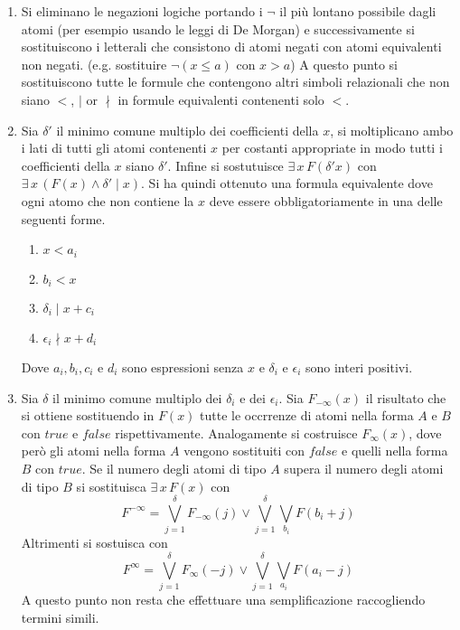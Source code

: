 \documentclass[11pt,letterpaper,twoside]{article}
\begin{document}
\begin{enumerate}[label=Step \arabic*.]
\item Si eliminano le negazioni logiche portando i $\lnot$ il più lontano
  possibile dagli atomi (per esempio usando le leggi di De Morgan) e
  successivamente si sostituiscono i letterali che consistono di atomi negati con
  atomi equivalenti non negati. (e.g. sostituire $\lnot (x \leq a)$ con $x > a$)
  A questo punto si sostituiscono tutte le formule che contengono altri simboli
  relazionali che non siano $<$, $\mid$ or $\nmid$ in formule equivalenti
  contenenti solo $<$.
\item Sia $\delta'$ il minimo comune multiplo dei coefficienti della $x$, si
  moltiplicano ambo i lati di tutti gli atomi contenenti $x$ per costanti
  appropriate in modo tutti i coefficienti della $x$ siano $\delta'$.
  Infine si sostutuisce $\exists \, x \, F(\delta' x)$ con $\exists \, x \,
  (F(x) \land \delta' \mid x)$.
  Si ha quindi ottenuto una formula equivalente dove ogni atomo che non contiene
  la $x$ deve essere obbligatoriamente in una delle seguenti forme.
  \begin{enumerate}[label=\Alph*.]
    \item $x < a_i$
    \item $b_i < x$
    \item $\delta_i \mid x + c_i$
    \item $\epsilon_i \nmid x + d_i$
  \end{enumerate}
  Dove $a_i, b_i, c_i$ e $d_i$ sono espressioni senza $x$ e $\delta_i$ e
  $\epsilon_i$ sono interi positivi.
\item Sia $\delta$ il minimo comune multiplo dei $\delta_i$ e dei
  $\epsilon_i$. Sia $F_{- \infty}(x)$ il risultato che si ottiene sostituendo in
  $F(x)$ tutte le occrrenze di atomi nella forma $A$ e $B$ con $true$ e
  $false$ rispettivamente. Analogamente si costruisce $F_{\infty}(x)$, dove però
  gli atomi nella forma $A$ vengono sostituiti con $false$ e quelli nella forma
  $B$ con $true$.
  Se il numero degli atomi di tipo $A$ supera il numero degli atomi di tipo $B$
  si sostituisca $\exists \, x \, F(x)$ con
  $$ F^{-\infty} =  \bigvee_{j=1}^{\delta} F_{- \infty}(j) \lor
  \bigvee_{j=1}^{\delta} \bigvee_{b_i} F(b_i + j)$$
  Altrimenti si sostuisca con
  $$ F^{\infty} =  \bigvee_{j=1}^{\delta} F_{\infty}(-j) \lor
  \bigvee_{j=1}^{\delta} \bigvee_{a_i} F(a_i - j)$$
  A questo punto non resta che effettuare una semplificazione raccogliendo
  termini simili.
\end{enumerate}
\end{document}
